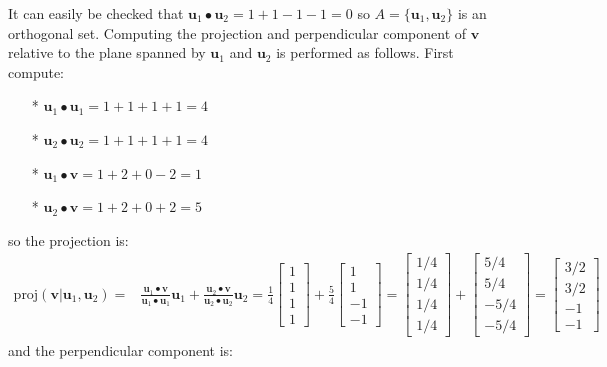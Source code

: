 \documentclass{article}
\begin{document}
\begin{itemize}
It can easily be checked that \(\mathbf{u}_1 \bullet \mathbf{u}_2 = 1 + 1 - 1 - 1 = 0\) so \(A = \{\mathbf{u}_1, \mathbf{u}_2\}\) is an orthogonal set. Computing the projection and perpendicular component of \(\mathbf{v}\) relative to the plane spanned by \(\mathbf{u}_1\) and \(\mathbf{u}_2\) is performed as follows. First compute:
\begin{itemize}
\item[*] \(\mathbf{u}_1 \bullet \mathbf{u}_1 = 1 + 1 + 1 + 1 = 4\)
\item[*] \(\mathbf{u}_2 \bullet \mathbf{u}_2 = 1 + 1 + 1 + 1 = 4\)
\item[*] \(\mathbf{u}_1 \bullet \mathbf{v} = 1 + 2 + 0 - 2 = 1\)
\item[*] \(\mathbf{u}_2 \bullet \mathbf{v} = 1 + 2 + 0 + 2 = 5\)
\end{itemize} 
so the projection is:
\begin{align*}
\text{proj}(\mathbf{v} | \mathbf{u}_1, \mathbf{u}_2) = & \frac{\mathbf{u}_1 \bullet \mathbf{v}}{\mathbf{u}_1 \bullet \mathbf{u}_1}\mathbf{u}_1 + \frac{\mathbf{u}_2 \bullet \mathbf{v}}{\mathbf{u}_2 \bullet \mathbf{u}_2}\mathbf{u}_2  
= \frac{1}{4}\begin{bmatrix} 1 \\ 1 \\ 1 \\ 1 \end{bmatrix} + \frac{5}{4}\begin{bmatrix} 1 \\ 1 \\ -1 \\ -1 \end{bmatrix} 
= \begin{bmatrix} 1/4 \\ 1/4 \\ 1/4 \\ 1/4 \end{bmatrix} + \begin{bmatrix} 5/4 \\ 5/4 \\ -5/4 \\ -5/4 \end{bmatrix} 
= \begin{bmatrix} 3/2 \\ 3/2 \\ -1 \\ -1 \end{bmatrix}
\end{align*}
and the perpendicular component is:

\end{itemize}
\end{document}
